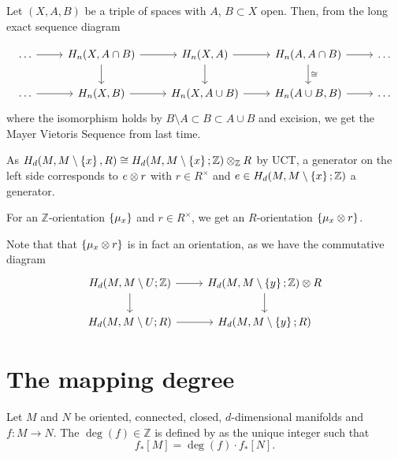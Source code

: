 

Let $(X,A,B)$ be a triple of spaces with  $A$,  $B\subset X$ open.
Then, from the long exact sequence diagram

\[
  \begin{tikzcd}
    \ldots
    \ar{r}
    &
    H_n(X, A\cap B)
    \ar{r}
    \ar{d}
    &
    H_n(X,A)
    \ar{r}
    \ar{d}
    &
    H_n(A,A\cap B)
    \ar{r}
    \ar{d}{\cong}
    &
    \ldots
    \\
    \ldots
    \ar{r}
    &
    H_n(X,B)
    \ar{r}
    &
    H_n(X,A\cup B)
    \ar{r}
    &
    H_n(A\cup B,B)
    \ar{r}
    &
    \ldots
  \end{tikzcd}
\]
where the isomorphism holds by $B \setminus A \subset B \subset A\cup B$ and excision,
we get the Mayer Vietoris Sequence from last time.

\begin{remark}
  As
  $H_d(M, M \setminus \left\{  x  \right\} ,R)
  \cong
  H_d(M, M \setminus \left\{  x  \right\} ; \mathbb{Z}) \otimes _{\mathbb{Z}} R$
  by UCT,
  a generator on the left side corresponds to
  $e\otimes r$ with $r\in R^{\times}$ and
  $e\in H_d(M, M \setminus \left\{  x  \right\} ; \mathbb{Z})$
  a generator.

  For an $\mathbb{Z}$-orientation $\left\{  \mu_x  \right\} $ and $r\in R^{\times}$,
  we get an $R$-orientation  $\left\{  \mu_x \otimes r \right\} $.

  Note that that $\left\{  \mu_x \otimes r  \right\} $ is in fact an orientation,
  as we have the commutative diagram
  \[
  \begin{tikzcd}
    H_d(M, M \setminus U; \mathbb{Z}) \ar[swap]{d}{} \ar{r}{} & H_d(M, M\setminus \set{ y } ; \mathbb{Z}) \tensor R \ar{d}{} \\
    H_d(M , M \setminus U; R) \ar[swap]{r}{} & H_d(M, M\setminus \set{ y } ; R)
  \end{tikzcd}
  \]
\end{remark}




\section{The mapping degree}

\begin{definition}
  \label{def:mapping-degree-oriented-closed-connected-manifolds}
  Let $M$ and $N$ be oriented, connected, closed,
  $d$-dimensional manifolds and $f\colon M\to N$.
  The  $\deg(f)\in \mathbb{Z}$
  is defined by as the unique integer such that
  \[
    f_*[M] = \deg(f)\cdot f_*[N]
  .\] 
\end{definition}

